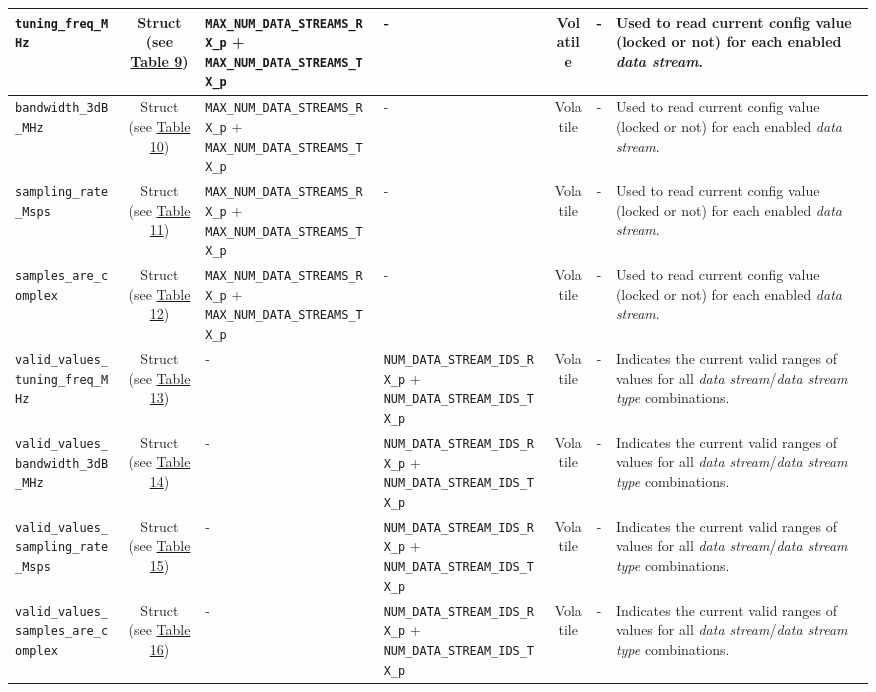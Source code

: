 \documentclass{article}
\begin{document}
\begin{landscape}
\begin{scriptsize}
\begin{longtable}{|p{5.3cm}|c|p{3.5cm}|p{3.5cm}|c|c|p{4.4cm}|}
			\hline
			\verb+tuning_freq_MHz+       & Struct (see \hyperlink{tab9}{Table 9}) & \verb+MAX_NUM_DATA_STREAMS_RX_p+ + \verb+MAX_NUM_DATA_STREAMS_TX_p+ & - &Volatile    & -       & Used to read current config value (locked or not) for each enabled \textit{data stream}. \\
			\hline
			\verb+bandwidth_3dB_MHz+     & Struct (see \hyperlink{tab10}{Table 10}) & \verb+MAX_NUM_DATA_STREAMS_RX_p+ + \verb+MAX_NUM_DATA_STREAMS_TX_p+ & - &Volatile    & -       & Used to read current config value (locked or not) for each enabled \textit{data stream}. \\
			\hline
			\verb+sampling_rate_Msps+    & Struct (see \hyperlink{tab11}{Table 11}) & \verb+MAX_NUM_DATA_STREAMS_RX_p+ + \verb+MAX_NUM_DATA_STREAMS_TX_p+ & - &Volatile    & -       & Used to read current config value (locked or not) for each enabled \textit{data stream}. \\
			\hline
			\verb+samples_are_complex+    & Struct (see \hyperlink{tab12}{Table 12}) & \verb+MAX_NUM_DATA_STREAMS_RX_p+ + \verb+MAX_NUM_DATA_STREAMS_TX_p+ & - &Volatile    & -       & Used to read current config value (locked or not) for each enabled \textit{data stream}. \\
			\hline
			\verb+valid_values_tuning_freq_MHz+    & Struct (see \hyperlink{tab13}{Table 13}) & - & \verb+NUM_DATA_STREAM_IDS_RX_p+ + \verb+NUM_DATA_STREAM_IDS_TX_p+ & Volatile    & -       & Indicates the current valid ranges of values for all \textit{data stream}/\textit{data stream type} combinations. \\
			\hline
			\verb+valid_values_bandwidth_3dB_MHz+    & Struct  (see \hyperlink{tab14}{Table 14})& - & \verb+NUM_DATA_STREAM_IDS_RX_p+ + \verb+NUM_DATA_STREAM_IDS_TX_p+ & Volatile    & -       & Indicates the current valid ranges of values for all \textit{data stream}/\textit{data stream type} combinations. \\
			\hline
			\verb+valid_values_sampling_rate_Msps+    & Struct  (see \hyperlink{tab15}{Table 15})& - & \verb+NUM_DATA_STREAM_IDS_RX_p+ + \verb+NUM_DATA_STREAM_IDS_TX_p+ & Volatile    & -       & Indicates the current valid ranges of values for all \textit{data stream}/\textit{data stream type} combinations. \\
			\hline
			\verb+valid_values_samples_are_complex+    & Struct  (see \hyperlink{tab16}{Table 16})& - & \verb+NUM_DATA_STREAM_IDS_RX_p+ + \verb+NUM_DATA_STREAM_IDS_TX_p+ & Volatile    & -       & Indicates the current valid ranges of values for all \textit{data stream}/\textit{data stream type} combinations. \\
			\hline


\end{longtable}
\end{scriptsize}
\end{landscape}
\end{document}
